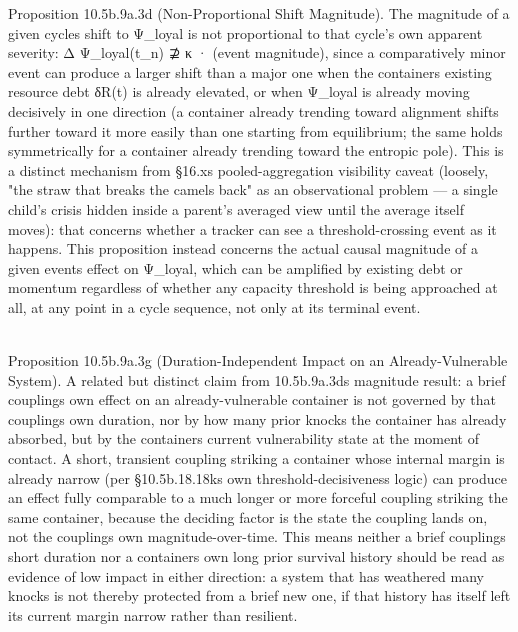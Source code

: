 \documentclass[
]{article}
\begin{document}
Proposition 10.5b.9a.3d (Non-Proportional Shift Magnitude). The
magnitude of a given cycles shift to Ψ\_loyal is not proportional to
that cycle's own apparent severity: Δ Ψ\_loyal(t\_n) ⊉ κ · (event
magnitude), since a comparatively minor event can produce a larger shift
than a major one when the containers existing resource debt δR(t) is
already elevated, or when Ψ\_loyal is already moving decisively in one
direction (a container already trending toward alignment shifts further
toward it more easily than one starting from equilibrium; the same holds
symmetrically for a container already trending toward the entropic
pole). This is a distinct mechanism from §16.xs pooled-aggregation
visibility caveat (loosely, "the straw that breaks the camels back" as
an observational problem --- a single child's crisis hidden inside a
parent's averaged view until the average itself moves): that concerns
whether a tracker can see a threshold-crossing event as it happens. This
proposition instead concerns the actual causal magnitude of a given
events effect on Ψ\_loyal, which can be amplified by existing debt or
momentum regardless of whether any capacity threshold is being
approached at all, at any point in a cycle sequence, not only at its
terminal event.\\
\strut \\
Proposition 10.5b.9a.3g (Duration-Independent Impact on an
Already-Vulnerable System). A related but distinct claim from
10.5b.9a.3d\textquotesingle s magnitude result: a brief
coupling\textquotesingle s own effect on an already-vulnerable container
is not governed by that coupling\textquotesingle s own duration, nor by
how many prior knocks the container has already absorbed, but by the
container\textquotesingle s current vulnerability state at the moment of
contact. A short, transient coupling striking a container whose internal
margin is already narrow (per §10.5b.18.18k\textquotesingle s own
threshold-decisiveness logic) can produce an effect fully comparable to
a much longer or more forceful coupling striking the same container,
because the deciding factor is the state the coupling lands on, not the
coupling\textquotesingle s own magnitude-over-time. This means neither a
brief coupling\textquotesingle s short duration nor a
container\textquotesingle s own long prior survival history should be
read as evidence of low impact in either direction: a system that has
weathered many knocks is not thereby protected from a brief new one, if
that history has itself left its current margin narrow rather than
resilient.
\end{document}
